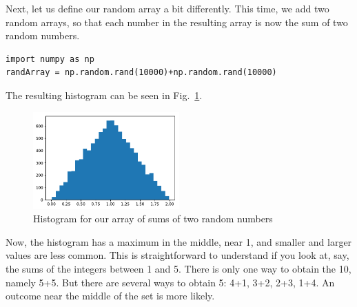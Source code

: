 \documentclass[twocolumn,apj]{openjournal}
\begin{document}
Next, let us define our random array a bit differently. This time, we add two random arrays, so that each number in the resulting array is now the sum of two random numbers.
\begin{lstlisting}
import numpy as np
randArray = np.random.rand(10000)+np.random.rand(10000)
\end{lstlisting}
The resulting histogram can be seen in Fig.~\ref{Histo2}.
\begin{figure}[htbp]
\begin{center}
\includegraphics[width=0.5\textwidth]{randomfield2.pdf}
\caption{Histogram for our array of sums of two random numbers}
\label{Histo2}
\end{center}
\end{figure}
Now, the histogram has a maximum in the middle, near 1, and smaller and larger values are less common. This is straightforward to understand if you look at, say, the sums of the integers between 1 and 5. There is only one way to obtain the 10, namely 5+5. But there are several ways to obtain 5: 4+1, 3+2, 2+3, 1+4. An outcome near the middle of the set is more likely.
\end{document}
